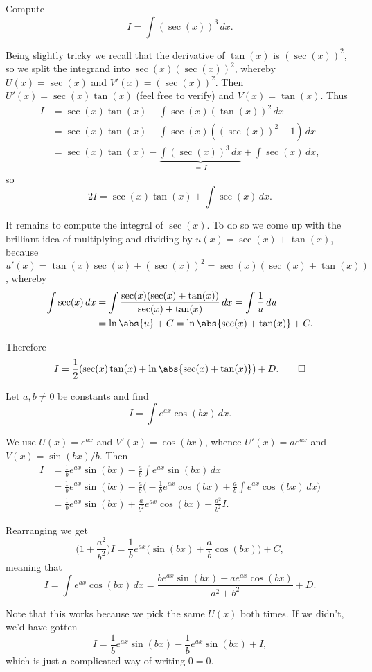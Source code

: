 \begin{example}
	Compute
	\[
		I = \int (\sec(x))^3 \, d x.
	\]

	\noindent
	Being slightly tricky we recall that the derivative of $\tan(x)$ is $(\sec(x))^2$, so we split the integrand into $\sec(x) (\sec(x))^2$, whereby $U(x) = \sec(x)$ and $V'(x) = (\sec(x))^2$.
	Then $U'(x) = \sec(x) \tan(x)$ (feel free to verify) and $V(x) = \tan(x)$.
	Thus
	\begin{align*}
		I &= \sec(x) \tan(x) - \int \sec(x) (\tan(x))^2 \, d x \\
		  &= \sec(x) \tan(x) - \int \sec(x) ((\sec(x))^2 - 1) \, d x \\
			&= \sec(x) \tan(x) - \underbrace{\int (\sec(x))^3 \, d x}_{=\, I} + \int \sec(x) \, d x,
	\end{align*}
	so
	\[
		2 I = \sec(x) \tan(x) + \int \sec(x) \, d x.
	\]

	\noindent
	It remains to compute the integral of $\sec(x)$.
	To do so we come up with the brilliant idea of multiplying and dividing by $u(x) = \sec(x) + \tan(x)$, because $u'(x) = \tan(x) \sec(x) + (\sec(x))^2 = \sec(x) (\sec(x) + \tan(x))$, whereby
	\begin{align*}
		\int \sec(x) \, d x &= \int \frac{\sec(x) (\sec(x) + \tan(x))}{\sec(x) + \tan(x)} \, d x = \int \frac{1}{u} \, d u \\
		                    &= \ln\abs{u} + C = \ln\abs{\sec(x) + \tan(x)} + C.
	\end{align*}

	\noindent
	Therefore
	\[
		I = \frac{1}{2} (\sec(x) \tan(x) + \ln\abs{\sec(x) + \tan(x)}) + D. \qedhere
	\]
\end{example}

\begin{example}
	Let $a, b \neq 0$ be constants and find
	\[
		I = \int e^{a x} \cos(b x) \, d x.
	\]

	\noindent
	We use $U(x) = e^{a x}$ and $V'(x) = \cos(bx)$, whence $U'(x) = a e^{a x}$ and $V(x) = \sin(b x) / b$.
	Then
	\begin{align*}
		I &= \frac{1}{b} e^{a x} \sin(b x) - \frac{a}{b} \int e^{a x} \sin(b x) \, d x \\
		  &= \frac{1}{b} e^{a x} \sin(b x) - \frac{a}{b} \Big ( - \frac{1}{b} e^{a x} \cos(b x) + \frac{a}{b} \int e^{a x} \cos(b x) \, d x \Big ) \\
			&= \frac{1}{b} e^{a x} \sin(b x) + \frac{a}{b^2} e^{a x} \cos(b x) - \frac{a^2}{b^2} I.
	\end{align*}

	\noindent
	Rearranging we get
	\[
		\Big ( 1 + \frac{a^2}{b^2} \Big ) I = \frac{1}{b} e^{a x} \Big ( \sin(b x) + \frac{a}{b} \cos(b x) \Big ) + C,
	\]
	meaning that
	\[
		I = \int e^{a x} \cos(b x) \, d x = \frac{b e^{a x} \sin(b x) + a e^{a x} \cos(b x)}{a^2 + b^2} + D.
	\]

	\noindent
	Note that this works because we pick the same $U(x)$ both times.
	If we didn't, we'd have gotten
	\[
		I = \frac{1}{b} e^{a x} \sin(b x) - \frac{1}{b} e^{a x} \sin(b x) + I,
	\]
	which is just a complicated way of writing $0 = 0$.
\end{example}

